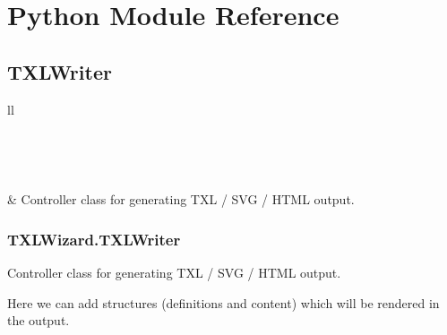 \documentclass[letterpaper,10pt,english]{sphinxmanual}
\begin{document}
\section{Python Module Reference}
\label{Chapters/40_PythonModuleReference:python-module-reference}\label{Chapters/40_PythonModuleReference:pythonmodulereference}\label{Chapters/40_PythonModuleReference::doc}

\subsection{TXLWriter}
\label{Chapters/40_PythonModuleReference:txlwriter}
\begin{longtable}{ll}
\hline
\endfirsthead

%
{{}} \\
\hline
\endhead

\hline {} \\ \hline
\endfoot

\endlastfoot


{\hyperref[Chapters/PythonModuleReference/TXLWriter/TXLWizard.TXLWriter:module\string-TXLWizard.TXLWriter]{}}
 & 
Controller class for generating TXL / SVG / HTML output.
\\
\hline\end{longtable}



\subsubsection{TXLWizard.TXLWriter}
\label{Chapters/PythonModuleReference/TXLWriter/TXLWizard.TXLWriter:txlwizard-txlwriter}\label{Chapters/PythonModuleReference/TXLWriter/TXLWizard.TXLWriter:module-TXLWizard.TXLWriter}\label{Chapters/PythonModuleReference/TXLWriter/TXLWizard.TXLWriter::doc}
Controller class for generating TXL / SVG / HTML output.

Here we can add structures (definitions and content) which will be rendered in the output.
\end{document}
